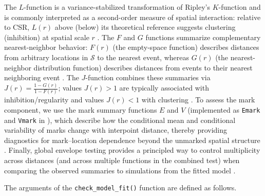 {The \(L\)-function is a variance-stabilized transformation of Ripley's \(K\)-function and is commonly interpreted as a second-order measure of spatial interaction: relative to CSR, \(L(r)\) above (below) its theoretical reference suggests clustering (inhibition) at spatial scale \(r\) \citep[\citet{diggleStatisticalAnalysisSpatial2013}]{ripleySecondorderAnalysisStationary1976}. The \(F\) and \(G\) functions summarize complementary nearest-neighbor behavior: \(F(r)\) (the empty-space function) describes distances from arbitrary locations in \(\mathscr{S}\) to the nearest event, whereas \(G(r)\) (the nearest-neighbor distribution function) describes distances from events to their nearest neighboring event \citep{diggleStatisticalAnalysisSpatial2013}. The \(J\)-function combines these summaries via \(J(r) = \frac{1-G(r)}{1-F(r)}\); values \(J(r) > 1\) are typically associated with inhibition/regularity and values \(J(r) < 1\) with clustering \citep{lieshoutJFunctionMarkedPoint2006}. To assess the mark component, we use the mark summary functions \(E\) and \(V\) (implemented as \texttt{Emark} and \texttt{Vmark} in ), which describe how the conditional mean and conditional variability of marks change with interpoint distance, thereby providing diagnostics for mark--location dependence beyond the unmarked spatial structure \citep[\citet{baddeleySpatialPointPatterns2015}]{schlatherDetectingDependenceMarks2004}. Finally, global envelope testing provides a principled way to control multiplicity across distances (and across multiple functions in the combined test) when comparing the observed summaries to simulations from the fitted model \citep{myllymakiGlobalEnvelopeTests2017}.}

The arguments of the \texttt{check\_model\_fit()} function are defined as follows.

